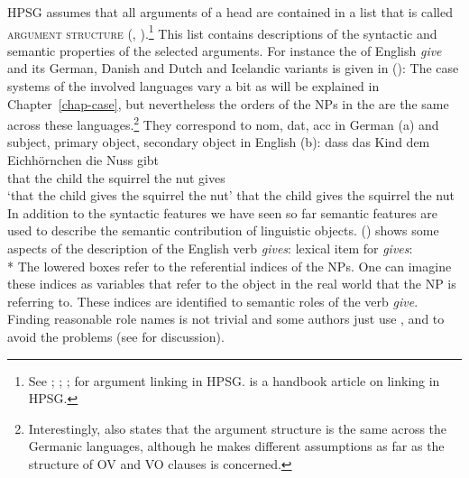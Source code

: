 HPSG assumes that all arguments of a head are contained in a list that is called \textsc{argument
  structure} (\argst, \citealp*{DKW2021a}).\footnote{%
See \citealp[--29]{ps2}; \citealp{Wechsler95a-u};
\citealp{Davis2001a-u}; \citealp[Section~5.6]{MuellerLehrbuch1} for argument
linking in HPSG.  is a handbook article on linking in HPSG.
} This list contains descriptions of the syntactic and semantic properties of
the selected arguments. For instance the \argstl of English \emph{give} and its German, Danish and
Dutch and Icelandic variants is given in ():
\ea
{}
\z
The case systems of the involved languages vary a bit as will be explained in
Chapter~\ref{chap-case}, but nevertheless the orders of the NPs in the \argstl are the same across these
languages.\footnote{%
  Interestingly, \citet[]{Haider2010a} also states that the argument structure is the same
  across the Germanic languages, although he makes different assumptions as far as the structure of
  OV and VO clauses is concerned.%
} They correspond to nom, dat, acc in German (a) and subject, primary object, secondary object
in English (b):
\eal
\ex 
\gll dass das Kind dem Eichhörnchen die Nuss gibt\\
    that the child  the squirrel    the nut gives\\
\glt `that the child gives the squirrel the nut'
\ex that the child gives the squirrel the nut
\zl
In addition to the syntactic features we have seen so far semantic features are used to describe the
semantic contribution of linguistic objects. () shows some aspects of the description of the English verb
\emph{gives}:
\ea
lexical item for \emph{gives}:\\*
\z
The lowered boxes refer to the referential indices of the NPs. One can imagine these indices as
variables that refer to the object in the real world that the NP is referring to. These indices are
identified to semantic roles of the verb \emph{give}. Finding reasonable role names is not trivial
and some authors just use \argone, \argtwo and \argthree to avoid the problems (see \citealp{Dowty91a}
for discussion).

